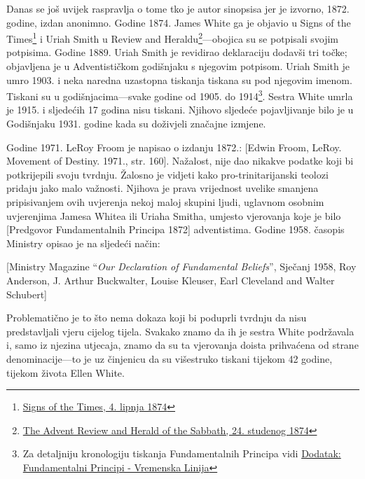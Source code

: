 Danas se još uvijek raspravlja o tome tko je autor sinopsisa jer je izvorno, 1872. godine, izdan anonimno. Godine 1874. James White ga je objavio u Signs of the Times\footnote{\href{https://adventistdigitallibrary.org/adl-364148/signs-times-june-4-1874}{Signs of the Times, 4. lipnja 1874}} i Uriah Smith u Review and Heraldu\footnote{\href{http://documents.adventistarchives.org/Periodicals/RH/RH18741124-V44-22.pdf}{The Advent Review and Herald of the Sabbath, 24. studenog 1874}}—obojica su se potpisali svojim potpisima. Godine 1889. Uriah Smith je revidirao deklaraciju dodavši tri točke; objavljena je u Adventističkom godišnjaku s njegovim potpisom. Uriah Smith je umro 1903. i neka naredna uzastopna tiskanja  tiskana su pod njegovim imenom. Tiskani su u godišnjacima—svake godine od 1905. do 1914\footnote{Za detaljniju kronologiju tiskanja Fundamentalnih Principa vidi \hyperref[appendix:timeline]{Dodatak: Fundamentalni Principi - Vremenska Linija}}. Sestra White umrla je 1915. i sljedećih 17 godina  nisu tiskani. Njihovo sljedeće pojavljivanje bilo je u Godišnjaku 1931. godine kada su doživjeli značajne izmjene.

Godine 1971. LeRoy Froom je napisao o izdanju 1872.: [Edwin Froom, LeRoy. Movement of Destiny. 1971., str. 160]. Nažalost, nije dao nikakve podatke koji bi potkrijepili svoju tvrdnju. Žalosno je vidjeti kako pro-trinitarijanski teolozi pridaju  jako malo važnosti. Njihova je prava vrijednost uvelike smanjena pripisivanjem ovih uvjerenja nekoj maloj skupini ljudi, uglavnom osobnim uvjerenjima Jamesa Whitea ili Uriaha Smitha, umjesto vjerovanja koje je bilo [Predgovor Fundamentalnih Principa 1872] adventistima. Godine 1958. časopis Ministry opisao je  na sljedeći način:

[Ministry Magazine “\textit{Our Declaration of Fundamental Beliefs}”, Sječanj 1958, Roy Anderson, J. Arthur Buckwalter, Louise Kleuser, Earl Cleveland and Walter Schubert]

Problematično je to što nema dokaza koji bi poduprli tvrdnju da  nisu predstavljali vjeru cijelog tijela. Svakako znamo da ih je sestra White podržavala i, samo iz njezina utjecaja, znamo da su ta vjerovanja doista prihvaćena od strane denominacije—to je uz činjenicu da su višestruko tiskani tijekom 42 godine, tijekom života Ellen White.

